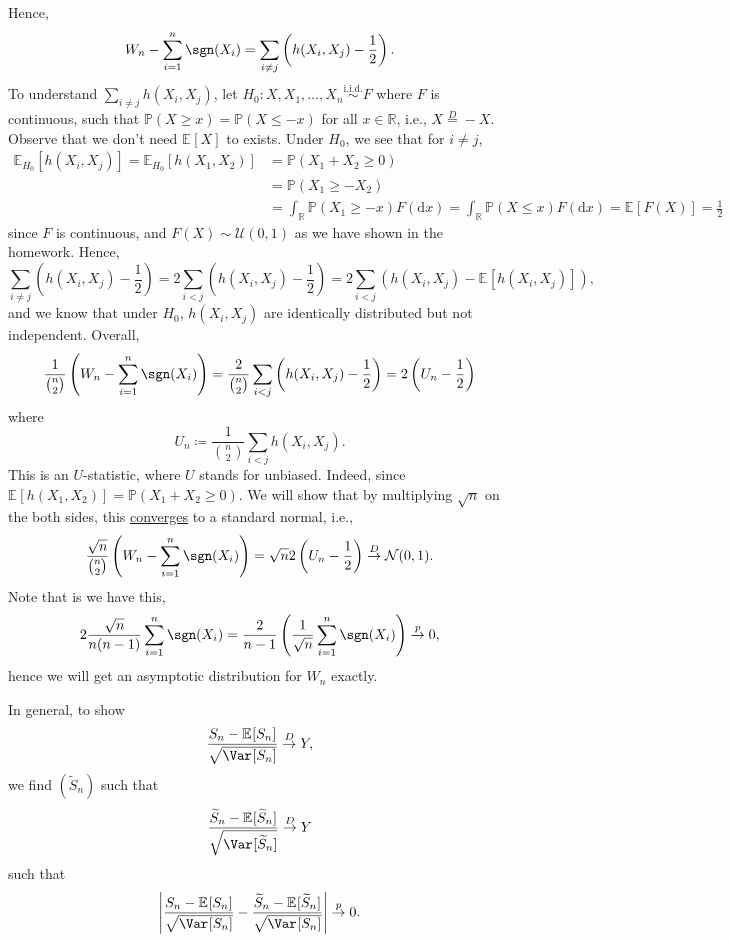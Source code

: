 Hence,
\[
	W_n - \sum_{i=1}^{n} \sgn (X_i)
	= \sum_{i \neq j} \left( h(X_i , X_j) - \frac{1}{2} \right).
\]
To understand \(\sum_{i \neq j} h(X_i, X_j)\), let \(H_0 \colon X, X_1, \dots , X_n \overset{\text{i.i.d.} }{\sim } F\) where \(F\) is continuous, such that \(\mathbb{P} (X \geq x) = \mathbb{P} (X \leq -x)\) for all \(x \in \mathbb{R} \), i.e., \(X \overset{D}{=} -X\). Observe that we don't need \(\mathbb{E}_{}[X] \) to exists. Under \(H_0\), we see that for \(i \neq j\),
\[
	\begin{split}
		\mathbb{E}_{H_0}[h(X_i, X_j)]
		= \mathbb{E}_{H_0}[h(X_1, X_2)]
		 & = \mathbb{P} (X_1 + X_2 \geq 0)                             \\
		 & = \mathbb{P} (X_1 \geq -X_2)                                \\
		 & = \int _\mathbb{R} \mathbb{P} (X_1 \geq -x) F(\mathrm{d} x)
		= \int _\mathbb{R} \mathbb{P} (X \leq x) F(\mathrm{d} x)
		= \mathbb{E}_{}[F(X)]
		= \frac{1}{2}
	\end{split}
\]
since \(F\) is continuous, and \(F(X) \sim \mathcal{U} (0, 1)\) as we have shown in the homework. Hence,
\[
	\sum_{i \neq j} \left( h(X_i, X_j) - \frac{1}{2} \right)
	= 2 \sum_{i < j} \left( h(X_i, X_j) - \frac{1}{2} \right)
	= 2 \sum_{i < j} \left( h(X_i, X_j) - \mathbb{E}_{}[h(X_i, X_j)] \right),
\]
and we know that under \(H_0\), \(h(X_i, X_j)\) are identically distributed but not independent. Overall,
\[
	\frac{1}{\binom{n}{2}} \left( W_n - \sum_{i=1}^{n} \sgn (X_i) \right)
	= \frac{2}{\binom{n}{2}} \sum_{i < j} \left( h(X_i, X_j) - \frac{1}{2} \right)
	= 2 \left( U_n - \frac{1}{2} \right)
\]
where
\[
	U_n \coloneqq \frac{1}{\binom{n}{2}} \sum_{i < j} h(X_i, X_j).
\]
This is an \(U\)-statistic, where \(U\) stands for unbiased. Indeed, since \(\mathbb{E}_{}[h(X_1, X_2)] = \mathbb{P} (X_1 + X_2 \geq 0)\). We will show that by multiplying \(\sqrt{n} \) on the both sides, this \hyperref[def:converge-in-distribution]{converges} to a standard normal, i.e.,
\[
	\frac{\sqrt{n}}{\binom{n}{2}}  \left( W_n - \sum_{i=1}^{n} \sgn (X_i) \right)
	= \sqrt{n} 2 \left( U_n - \frac{1}{2} \right)
	\overset{D}{\to} \mathcal{N} (0, 1).
\]
Note that is we have this,
\[
	2 \frac{\sqrt{n} }{n(n-1)} \sum_{i=1}^{n} \sgn (X_i)
	= \frac{2}{n-1} \left( \frac{1}{\sqrt{n} } \sum_{i=1}^{n} \sgn (X_i) \right)
	\overset{p}{\to} 0,
\]
hence we will get an asymptotic distribution for \(W_n\) exactly.

In general, to show
\[
	\frac{S_n - \mathbb{E}_{}[S_n] }{\sqrt{\Var_{}[S_n] } }
	\overset{D}{\to} Y,
\]
we find \((\widetilde{S} _n)\) such that
\[
	\frac{\widetilde{S} _n - \mathbb{E}_{}[\widetilde{S} _n] }{\sqrt{\Var_{}[\widetilde{S} _n] } }
	\overset{D}{\to} Y
\]
such that
\[
	\left\vert \frac{S_n - \mathbb{E}_{}[S_n] }{\sqrt{\Var_{}[S_n] } } - \frac{\widetilde{S} _n - \mathbb{E}_{}[\widetilde{S} _n] }{\sqrt{\Var_{}[S_n] } }\right\vert
	\overset{p}{\to} 0.
\]

